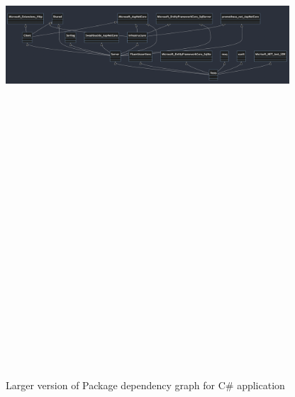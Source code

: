\begin{figure}[H]
    \centering
    \includegraphics[angle = 90, width = 300pt, height = 700pt]{Images/dependencies2.png}
    \caption{Larger version of Package dependency graph for C\# application}
    \label{fig:packageDependencyGraph2}
    \centering
\end{figure}

